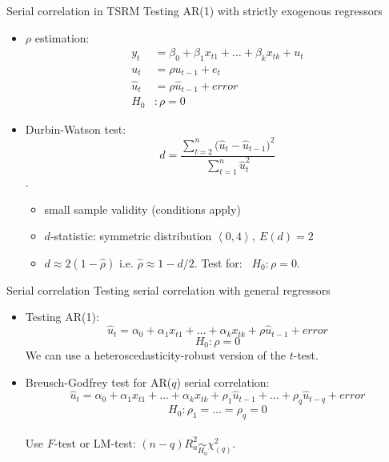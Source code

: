 \documentclass{beamer}
\begin{document}
\begin{frame}{Serial correlation in TSRM}
Testing AR(1) with strictly exogenous regressors\\ \medskip
\begin{itemize}
\item $\rho$ estimation:
\begin{align}\nonumber
y_t & = \beta_0+\beta_1 x_{t1}+\dots+\beta_k x_{tk}+u_t \\ \nonumber
u_t & = \rho u_{t-1} + e_t \\ \nonumber
\hat{u}_t &= \rho \hat{u}_{t-1}+error \\ \nonumber
H_0 & : \rho=0 \nonumber
\end{align}
\item Durbin-Watson test: $$d = \frac{\sum \limits^n_{t=2} \big(\hat{u}_t - \hat{u}_{t-1}\big)^2}{\sum \limits^n_{t=1}\hat{u}^2_t}$$.
\begin{itemize}
\item small sample validity (conditions apply)\\
\item $d$-statistic: symmetric distribution $\left\langle 0,4 \right\rangle, \> E(d)=2$
\item $ d \approx 2(1-\hat{\rho}) $    i.e.   $\hat{\rho} \approx 1-d/2$. Test for: \ $ H_0: \rho=0$.
\end{itemize}
\end{itemize}
\end{frame}
\begin{frame}{Serial correlation}
Testing serial correlation with general regressors\\ \medskip
\begin{itemize}
\item Testing AR(1):
$$\hat{u}_t=\alpha_0+\alpha_1 x_{t1} + \dots + \alpha_k x_{tk} + \rho \hat{u}_{t-1} + \textit{error}$$
$$H_0 : \rho = 0$$
We can use a heteroscedasticity-robust version of the $t$-test.\\ \bigskip
\item Breusch-Godfrey test for AR($q$) serial correlation:
$$\hat{u}_t=\alpha_0+\alpha_1 x_{t1} + \dots + \alpha_k x_{tk} + \rho_1 \hat{u}_{t-1} +\dots+ \rho_q \hat{u}_{t-q}+\textit{error}  $$
$$H_0 : \rho_1 = \dots = \rho_q = 0$$ \\ \medskip
Use $F$-test \quad or \quad LM-test: $(n-q)R_a^2 \underset{H_0}{\sim} \chi^2_{(q)}$.
\end{itemize}
\end{frame}
\end{document}
